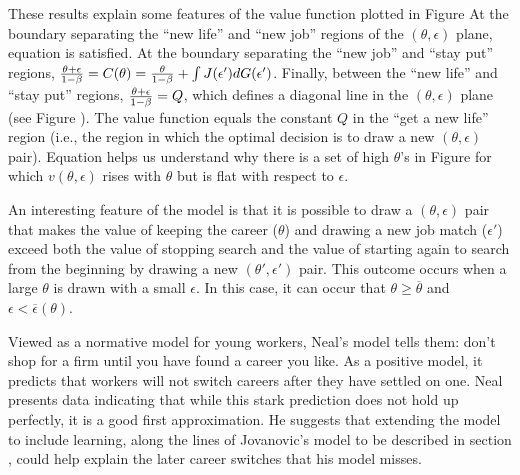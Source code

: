 These results explain some features of the value function
plotted in Figure  %
  At the boundary separating
the ``new life'' and ``new job''  regions of the $(\theta, \epsilon)$
plane, equation  is satisfied.   At the boundary
separating   the ``new job'' and ``stay put'' regions,
$ {\theta + \epsilon \over 1 - \beta} =  C(\theta) =
{\theta \over 1-\beta} + \int J(\epsilon') d G(\epsilon')$.
Finally, between the ``new life'' and ``stay put'' regions,
${\theta + \epsilon \over 1 - \beta} = Q$, which defines
a diagonal line in the $(\theta, \epsilon)$ plane (see Figure
). %
  The value function
equals the constant $Q$
in the ``get a new life'' region (i.e., the region in which the optimal decision is to draw a new $(\theta,\epsilon)$
pair).   Equation  helps
us understand why there is a set of high $\theta$'s in Figure   %
for which $v(\theta,\epsilon)$ rises with $\theta$  but
is flat with respect to $\epsilon$.

  An interesting feature of the model is that it  is possible
to draw a $(\theta, \epsilon)$ pair that makes
the value of keeping the career ($\theta$) and drawing a new
job match   ($\epsilon'$) exceed both the value of
stopping search and the value of starting again to
search from the beginning by drawing a new $(\theta', \epsilon')$ pair.
This outcome  occurs when a large   $\theta$ is drawn with a small
$\epsilon$.  In this case, it can occur that  $\theta \geq \overline
 \theta$ and
$\epsilon < \overline \epsilon(\theta)$. 

  Viewed as a normative model for young workers, Neal's model tells them:
don't shop for a  firm  until you have found a career you like.
  As a positive model, it predicts that  workers   will not
switch careers after they have settled on one.   Neal presents
data indicating that while this stark prediction does not hold up perfectly, it
is a good first approximation.
He suggests that extending the model to include learning, along the
lines of Jovanovic's model to be described in section ,
could help  explain  the later career  switches that
his model misses.

